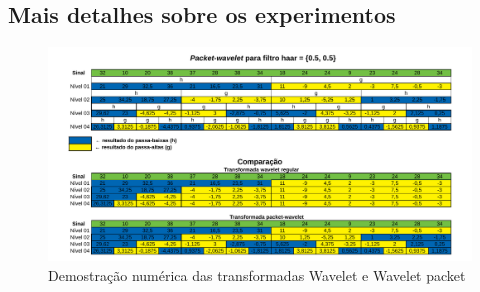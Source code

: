 	\begin{apendicesenv}
	
	\partapendices
	\chapter{Mais detalhes sobre os experimentos}
			
			\begin{landscape}
					\begin{figure}[h]
						\includegraphics[width=1\linewidth]{images/haarWaveletExamples.pdf}
						\caption{Demostração numérica das transformadas Wavelet e Wavelet packet}
						\label{fig:haarWaveletExamples}
					\end{figure}
			\end{landscape}
			\begin{figure}[h]
				\centering

\end{figure}
\end{apendicesenv}
